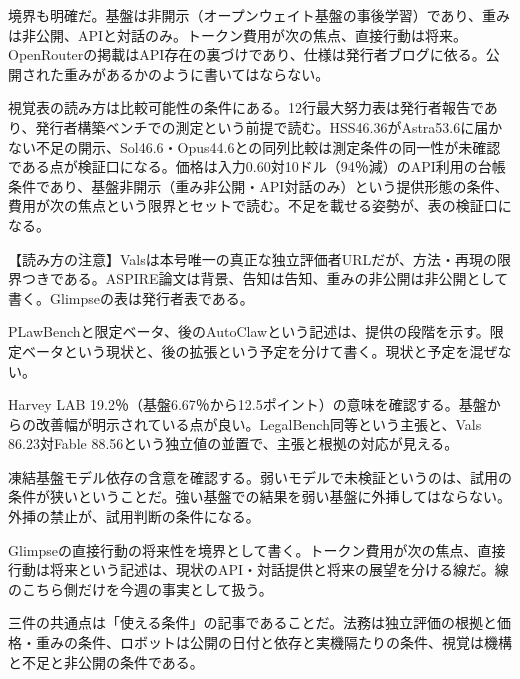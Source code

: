 \documentclass[lualatex,a4paper,10pt]{jlreq}
\begin{document}
境界も明確だ。基盤は非開示（オープンウェイト基盤の事後学習）であり、重みは非公開、APIと対話のみ。トークン費用が次の焦点、直接行動は将来。OpenRouterの掲載はAPI存在の裏づけであり、仕様は発行者ブログに依る。公開された重みがあるかのように書いてはならない。
\cite{B58,B59,B88}


視覚表の読み方は比較可能性の条件にある。12行最大努力表は発行者報告であり、発行者構築ベンチでの測定という前提で読む。HSS46.36がAstra53.6に届かない不足の開示、Sol46.6・Opus44.6との同列比較は測定条件の同一性が未確認である点が検証口になる。価格は入力0.60対10ドル（94％減）のAPI利用の台帳条件であり、基盤非開示（重み非公開・API対話のみ）という提供形態の条件、費用が次の焦点という限界とセットで読む。不足を載せる姿勢が、表の検証口になる。
\cite{B58,B59,B88}




\begin{tcolorbox}[colback=SurveySoft,colframe=SurveyRule,arc=1mm,boxrule=0.4pt,left=2mm,right=2mm]
【読み方の注意】Valsは本号唯一の真正な独立評価者URLだが、方法・再現の限界つきである。ASPIRE論文は背景、告知は告知、重みの非公開は非公開として書く。Glimpseの表は発行者表である。
\end{tcolorbox}
\cite{B55,B53,B54,B57,B56,B58,B59,B88}

PLawBenchと限定ベータ、後のAutoClawという記述は、提供の段階を示す。限定ベータという現状と、後の拡張という予定を分けて書く。現状と予定を混ぜない。
\cite{B55,B53,B54}


Harvey LAB 19.2％（基盤6.67％から12.5ポイント）の意味を確認する。基盤からの改善幅が明示されている点が良い。LegalBench同等という主張と、Vals 86.23対Fable 88.56という独立値の並置で、主張と根拠の対応が見える。
\cite{B55,B53,B54}


凍結基盤モデル依存の含意を確認する。弱いモデルで未検証というのは、試用の条件が狭いということだ。強い基盤での結果を弱い基盤に外挿してはならない。外挿の禁止が、試用判断の条件になる。
\cite{B57,B56}


Glimpseの直接行動の将来性を境界として書く。トークン費用が次の焦点、直接行動は将来という記述は、現状のAPI・対話提供と将来の展望を分ける線だ。線のこちら側だけを今週の事実として扱う。
\cite{B58,B59,B88}


三件の共通点は「使える条件」の記事であることだ。法務は独立評価の根拠と価格・重みの条件、ロボットは公開の日付と依存と実機隔たりの条件、視覚は機構と不足と非公開の条件である。
\cite{B55,B53,B54,B57,B56,B58,B59,B88}
\end{document}
